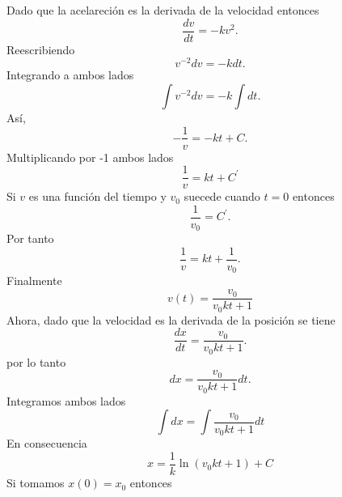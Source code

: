 \documentclass[12pt,a4paper]{article}
\begin{document}
    \begin{solucion}
        Dado que la acelareción es la derivada de la velocidad entonces
        \begin{equation*}
            \frac{dv}{dt}=-kv^{2}.
        \end{equation*}
        Reescribiendo
        \begin{equation*}
            v^{-2}dv=-kdt.
        \end{equation*}
        Integrando a ambos lados
        \begin{equation*}
            \int v^{-2}dv=-k\int dt.
        \end{equation*}
        Así,
        \begin{equation*}
            -\frac{1}{v}=-kt+C.
        \end{equation*}
        Multiplicando por -1 ambos lados
        \begin{equation*}
            \frac{1}{v}=kt+C^{\prime}
        \end{equation*}
        Si $v$ es una función del tiempo y $v_{0}$ suecede cuando $t=0$ entonces
        \begin{equation*}
            \frac{1}{v_{0}}=C^{\prime}.
        \end{equation*}
        Por tanto
        \begin{equation*}
            \frac{1}{v}=kt+\frac{1}{v_{0}}.
        \end{equation*}
        Finalmente
        \begin{equation*}
            v(t)=\frac{v_{0}}{v_{0}kt+1}
        \end{equation*}
        Ahora, dado que la velocidad es la derivada de la posición se tiene
        \begin{equation*}
            \frac{dx}{dt}=\frac{v_{0}}{v_{0}kt+1}.
        \end{equation*}
        por lo tanto
        \begin{equation*}
            dx=\frac{v_{0}}{v_{0}kt+1}dt.
        \end{equation*}
        Integramos ambos lados
        \begin{equation*}
            \int dx=\int\frac{v_{0}}{v_{0}kt+1}dt
        \end{equation*}
        En consecuencia
        \begin{equation*}
            x=\frac{1}{k}\ln(v_{0}kt+1)+C
        \end{equation*}
        Si tomamos $x(0)=x_{0}$ entonces
        \begin{equation*}

\end{equation*}
\end{solucion}
\end{document}
